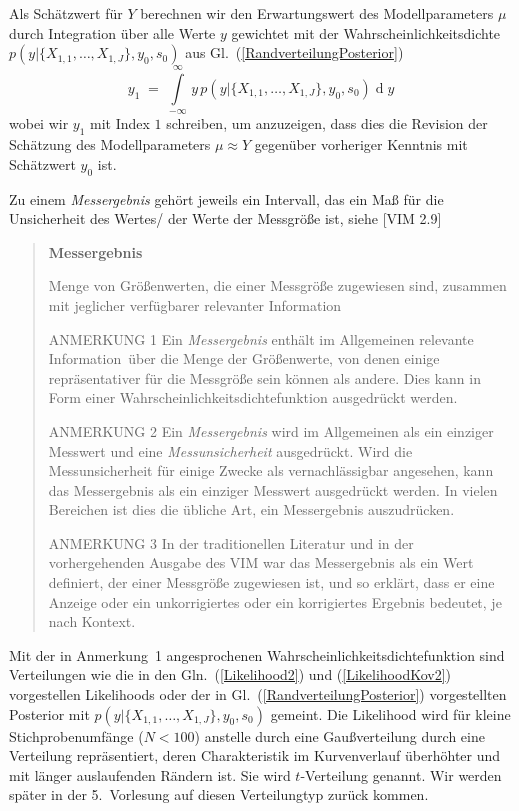 Als Schätzwert für $Y$ berechnen wir den Erwartungswert des Modellparameters $\mu$
durch Integration über alle Werte $y$ gewichtet mit der Wahrscheinlichkeitsdichte\\
$p(y | \{X_{1,1}, \dots, X_{1,J}\}, y_0, s_0)$ aus Gl.~(\ref{RandverteilungPosterior})
\begin{equation}
y_1 \; = \; \int\limits_{-\infty}^\infty \, y \, p(y | \{X_{1,1}, \dots, X_{1,J}\}, y_0, s_0) 
\operatorname{d}y
\end{equation}
wobei wir $y_1$ mit Index $1$ schreiben, um anzuzeigen, dass dies die Revision der Schätzung des 
Modellparameters $\mu \approx Y$ gegenüber vorheriger Kenntnis mit Schätzwert $y_0$ ist.

Zu einem \textsl{Messergebnis} gehört jeweils ein Intervall, das ein Maß für die Unsicherheit
des Wertes/ der Werte der Messgröße ist, siehe [VIM 2.9]

\begin{quote}
\textbf{Messergebnis}

Menge von Größenwerten, die einer Messgröße zugewiesen sind, zusammen mit jeglicher
verfügbarer relevanter Information

ANMERKUNG 1 Ein \textsl{Messergebnis} enthält im Allgemeinen \glqq relevante Information\grqq ~über
die Menge der Größenwerte, von denen einige repräsentativer für die Messgröße sein können als andere.
Dies kann in Form einer Wahrscheinlichkeitsdichtefunktion ausgedrückt werden.

ANMERKUNG 2 Ein \textsl{Messergebnis} wird im Allgemeinen
als ein einziger Messwert und eine \textsl{Messunsicherheit}
ausgedrückt. Wird die Messunsicherheit für einige
Zwecke als vernachlässigbar angesehen, kann das
Messergebnis als ein einziger Messwert ausgedrückt
werden. In vielen Bereichen ist dies die übliche Art, ein
Messergebnis auszudrücken.

ANMERKUNG 3 In der traditionellen Literatur und in der
vorhergehenden Ausgabe des VIM war das Messergebnis
als ein Wert definiert, der einer Messgröße zugewiesen
ist, und so erklärt, dass er eine Anzeige oder ein
unkorrigiertes oder ein korrigiertes Ergebnis bedeutet, je
nach Kontext.
\end{quote}

Mit der in Anmerkung~1 angesprochenen Wahrscheinlichkeitsdichtefunktion sind Verteilungen wie
die in den Gln.~(\ref{Likelihood2}) und (\ref{LikelihoodKov2}) vorgestellen Likelihoods oder
der in Gl.~(\ref{RandverteilungPosterior}) vorgestellten Posterior
mit $p(y | \{X_{1,1}, \dots, X_{1,J}\}, y_0, s_0)$ gemeint. Die Likelihood wird
für kleine Stich\-proben\-um\-fänge ($N < 100$) anstelle durch eine Gaußverteilung durch eine Verteilung 
repräsentiert, deren Charakteristik im Kurvenverlauf
überhöhter und mit länger auslaufenden Rändern ist. Sie wird $t$-Verteilung genannt.
Wir werden später in der 5.\ Vorlesung auf diesen Verteilungtyp zurück kommen.

